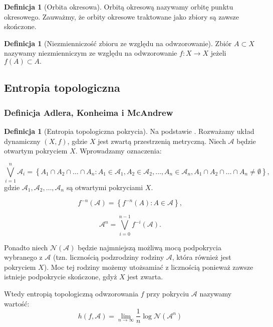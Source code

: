 \documentclass[licencjacka]{pwr_wmat_praca_dyplomowa}
\theoremstyle{plain}
\numberwithin{theorem}{chapter}
\theoremstyle{definition}
\numberwithin{theorem}{chapter}
\newtheorem{definition}[theorem]{Definicja}
\begin{document}
\begin{definition}[Orbita okresowa]
Orbitą okresową nazywamy orbitę punktu okresowego. Zauważmy, że orbity okresowe traktowane jako zbiory są zawsze skończone.
\end{definition}

\begin{definition}[Niezmienniczość zbioru ze względu na odwzorowanie]
Zbiór $A \subset X$ nazywamy niezmienniczym ze względu na odwzorowanie $f: X \rightarrow X$ jeżeli $f(A) \subset A.$
\end{definition}



\subsection{Entropia topologiczna}

\subsubsection{Definicja Adlera, Konheima i McAndrew}

\begin{definition}[Entropia topologiczna pokrycia]
Na podstawie \cite{misiurewicz1993}.
Rozważamy układ dynamiczny $(X, f)$, gdzie $X$ jest zwartą przestrzenią metryczną. Niech $\mathcal{A}$ będzie otwartym pokryciem $X$.
Wprowadzamy oznaczenia:

$$\bigvee_{i=1}^n \mathcal{A}_i = \left\{A_1 \cap A_2 \cap \ldots \cap A_n : A_1 \in \mathcal{A}_1, A_2 \in \mathcal{A}_2, \ldots, A_n \in \mathcal{A}_n, A_1 \cap A_2 \cap \ldots \cap A_n \neq \emptyset \right\},$$ 
gdzie $\mathcal{A}_1, \mathcal{A}_2, \ldots, \mathcal{A}_n$ są otwartymi pokryciami $X$.

$$f^{-n}(\mathcal{A}) = \left\{f^{-n}(A):A\in \mathcal{A}\right\},$$

$$\mathcal{A}^n = \bigvee_{i=0}^{n-1}f^{-i}(\mathcal{A}).$$

Ponadto niech $\mathcal{N}(\mathcal{A})$ będzie najmniejszą możliwą mocą podpokrycia wybranego z $\mathcal{A}$ (tzn. licznością podzrodziny rodziny $\mathcal{A}$, która również jest pokryciem $X$). Moc tej rodziny możemy utożsamiać z licznością ponieważ zawsze istnieje podpokrycie skończone, gdyż $X$ jest zwarta.

Wtedy entropią topologiczną odwzorowania $f$ przy pokryciu $\mathcal{A}$ nazywamy wartość:
$$h(f, \mathcal{A}) = \lim_{n \rightarrow \infty}{\frac{1}{n}\log\mathcal{N}(\mathcal{A}^n)}$$
\end{definition}
\end{document}
